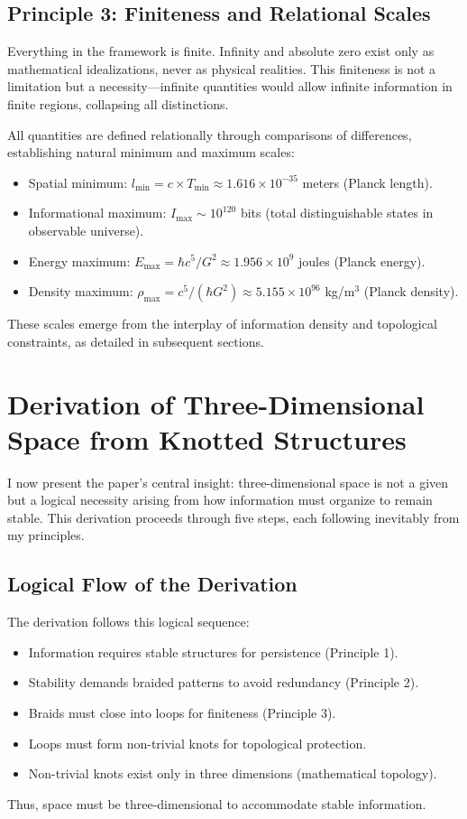 \documentclass{article}
\begin{document}
\subsection{Principle 3: Finiteness and Relational Scales}
Everything in the framework is finite. Infinity and absolute zero exist only as mathematical idealizations, never as physical realities. This finiteness is not a limitation but a necessity—infinite quantities would allow infinite information in finite regions, collapsing all distinctions.

All quantities are defined relationally through comparisons of differences, establishing natural minimum and maximum scales:
\begin{itemize}
\item Spatial minimum: $l_{\min} = c \times T_{\min} \approx 1.616 \times 10^{-35}$ meters (Planck length).
\item Informational maximum: $I_{\max} \sim 10^{120}$ bits (total distinguishable states in observable universe).
\item Energy maximum: $E_{\max} = \hbar c^5 / G^2 \approx 1.956 \times 10^9$ joules (Planck energy).
\item Density maximum: $\rho_{\max} = c^5 / (\hbar G^2) \approx 5.155 \times 10^{96}$ kg/m$^3$ (Planck density).
\end{itemize}

These scales emerge from the interplay of information density and topological constraints, as detailed in subsequent sections.

\section{Derivation of Three-Dimensional Space from Knotted Structures}
I now present the paper's central insight: three-dimensional space is not a given but a logical necessity arising from how information must organize to remain stable. This derivation proceeds through five steps, each following inevitably from my principles.

\subsection{Logical Flow of the Derivation}
The derivation follows this logical sequence:
\begin{itemize}
\item Information requires stable structures for persistence (Principle 1).
\item Stability demands braided patterns to avoid redundancy (Principle 2).
\item Braids must close into loops for finiteness (Principle 3).
\item Loops must form non-trivial knots for topological protection.
\item Non-trivial knots exist only in three dimensions (mathematical topology).
\end{itemize}
Thus, space must be three-dimensional to accommodate stable information.
\end{document}

